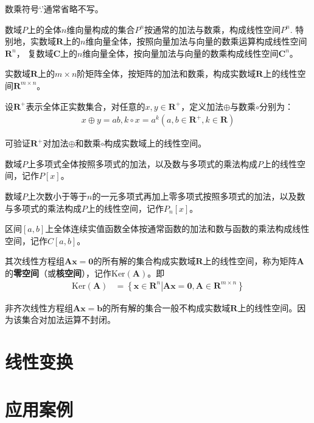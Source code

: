 \begin{remark}
    数乘符号‘.’通常省略不写。
\end{remark}

\begin{example}
    数域$P$上的全体$n$维向量构成的集合$P^{n}$按通常的加法与数乘，构成线性空间$P^{n}$.
    特别地，实数域$\mathbf{R}$上的$n$维向量全体，按照向量加法与向量的数乘运算构成线性空间$\mathbf{R}^{n}$，
    复数域$\mathbf{C}$上的$n$维向量全体，按向量加法与向量的数乘构成线性空间$\mathbf{C}^{n}$。
\end{example}

\begin{example}
    实数域$\mathbf{R}$上的$m\times{n}$阶矩阵全体，按矩阵的加法和数乘，构成实数域$\mathbf{R}$上的线性空间$\mathbf{R}^{m\times{n}}$。
\end{example}

\begin{example}
    设$\mathbf{R}^{+}$表示全体正实数集合，对任意的$x,y\in\mathbf{R}^{+}$，定义加法$\oplus$与数乘$\circ$分别为：
    \begin{eqnarray}
        x\oplus{y}=ab,k\circ{x}=a^{k}\left(a,b\in{\mathbf{R}^{+}},k\in\mathbf{R}\right)\nonumber
    \end{eqnarray}
\end{example}
可验证$\mathbf{R}^{+}$对加法$\oplus$和数乘$\circ$构成实数域上的线性空间。

\begin{example}
    数域$P$上多项式全体按照多项式的加法，以及数与多项式的乘法构成$P$上的线性空间，记作$P\left[x\right]$。
\end{example}

\begin{example}
    数域$P$上次数小于等于$n$的一元多项式再加上零多项式按照多项式的加法，以及数与多项式的乘法构成$P$上的线性空间，记作$P_{n}\left[x\right]$。
\end{example}

\begin{example}
    区间$\left[a,b\right]$上全体连续实值函数全体按通常函数的加法和数与函数的乘法构成线性空间，记作$C\left[a,b\right]$。
\end{example}

\begin{example}
    其次线性方程组$\mathbf{Ax}=\mathbf{0}$的所有解的集合构成实数域$\mathbf{R}$上的线性空间，称为矩阵$\mathbf{A}$的\textbf{零空间}（或\textbf{核空间}），记作$\text{Ker}\left(\mathbf{A}\right)$。即
    \begin{eqnarray}
        \text{Ker}\left(\mathbf{A}\right)&=\left\{\mathbf{x}\in{\mathbf{R}^{n}}\left|\mathbf{Ax}=\mathbf{0},\mathbf{A}\in\mathbf{R}^{m\times{n}}\right.\right\}
    \end{eqnarray}
\end{example}

非齐次线性方程组$\mathbf{Ax=b}$的所有解的集合一般不构成实数域$\mathbf{R}$上的线性空间。因为该集合对加法运算不封闭。

\section{线性变换}
\section{应用案例}
